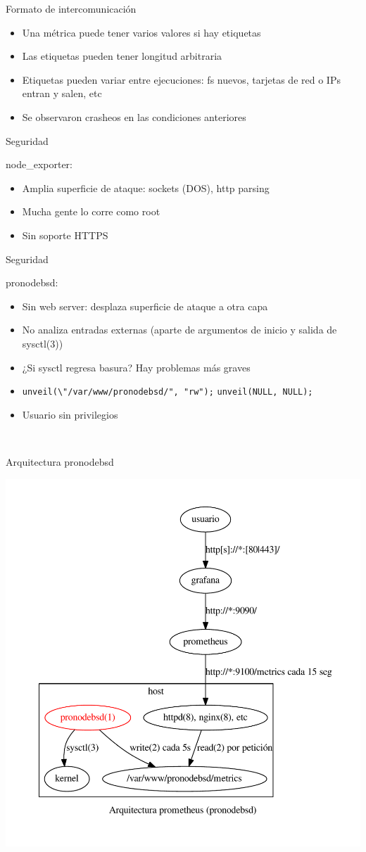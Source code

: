 \documentclass[11pt,spanish]{article}
\newcommand{\rowsp}[1][1em]{\vspace{#1}}
\newcommand{\hone}[1]{{\rowsp[0.3em]\noindent\Large #1 \rowsp[0.3em]}}
\newcommand{\displaypage}[1]{%
\
\vspace{\stretch{1}}
\begin{center}
\hone{#1}
\end{center}
\vspace{\stretch{1}}
}
\newcommand{\myitm}[1]{\begin{itemize}#1\end{itemize}}
\begin{document}
\newpage %
\hone{Formato de intercomunicación}

\myitm{
\item Una métrica puede tener varios valores si hay etiquetas
\item Las etiquetas pueden tener longitud arbitraria
\item Etiquetas pueden variar entre ejecuciones: fs nuevos, tarjetas
	de red o IPs entran y salen, etc
\item Se observaron crasheos en las condiciones anteriores
}
\newpage %

\hone{Seguridad}

node\_exporter:
\myitm{
\item Amplia superficie de ataque: sockets (DOS), http parsing
\item Mucha gente lo corre como root
\item Sin soporte HTTPS
}

\newpage %

\hone{Seguridad}

pronodebsd:
\myitm{
\item Sin web server: desplaza superficie de ataque a otra capa
\item No analiza entradas externas (aparte de argumentos de inicio y
	salida de sysctl(3))
\item ¿Si sysctl regresa basura? Hay problemas más graves
\item \lstinline|unveil(\"/var/www/pronodebsd/", "rw");|
	\lstinline|unveil(NULL, NULL);|
\item Usuario sin privilegios
}

\newpage %
\displaypage{Arquitectura pronodebsd}

\newpage %
\begin{center}
	\includegraphics[keepaspectratio=true,width=\textwidth,height=\textheight]{img/pronodebsd/arq-2}
\end{center}
\end{document}
